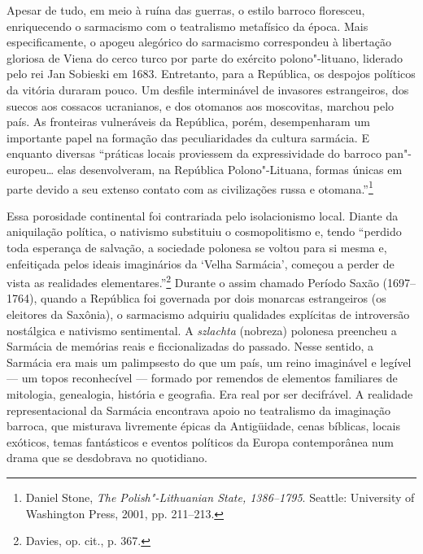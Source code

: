 Apesar de tudo, em meio à ruína das guerras, o estilo barroco floresceu,
enriquecendo o sarmacismo com o teatralismo metafísico da época. Mais
especificamente, o apogeu alegórico do sarmacismo correspondeu à
libertação gloriosa de Viena do cerco turco por parte do exército
polono"-lituano, liderado pelo rei Jan Sobieski em 1683. Entretanto, para
a República, os despojos políticos da vitória duraram pouco. Um desfile
interminável de invasores estrangeiros, dos suecos aos cossacos
ucranianos, e dos otomanos aos moscovitas, marchou pelo país. As
fronteiras vulneráveis da República, porém, desempenharam um importante
papel na formação das peculiaridades da cultura sarmácia. E enquanto
diversas ``práticas locais proviessem da expressividade do barroco
pan"-europeu\ldots{} elas desenvolveram, na República Polono"-Lituana,
formas únicas em parte devido a seu extenso contato com as civilizações
russa e otomana.''\footnote{Daniel Stone, \emph{The Polish"-Lithuanian
  State, 1386--1795}. Seattle: University of Washington Press, 2001, pp.
  211--213.}

%

Essa porosidade continental foi contrariada pelo isolacionismo local.
Diante da aniquilação política, o nativismo substituiu o cosmopolitismo
e, tendo ``perdido toda esperança de salvação, a sociedade polonesa se
voltou para si mesma e, enfeitiçada pelos ideais imaginários da `Velha
Sarmácia', começou a perder de vista as realidades
elementares.''\footnote{Davies, op. cit., p. 367.} Durante o assim
chamado Período Saxão (1697--1764), quando a República foi governada por
dois monarcas estrangeiros (os eleitores da Saxônia), o sarmacismo
adquiriu qualidades explícitas de introversão nostálgica e nativismo
sentimental. A \emph{szlachta} (nobreza) polonesa preencheu a Sarmácia
de memórias reais e ficcionalizadas do passado. Nesse sentido, a
Sarmácia era mais um palimpsesto do que um país, um reino imaginável e
legível --- um topos reconhecível --- formado por remendos de elementos
familiares de mitologia, genealogia, história e geografia. Era real por
ser decifrável. A realidade representacional da Sarmácia encontrava
apoio no teatralismo da imaginação barroca, que misturava livremente
épicas da Antigüidade, cenas bíblicas, locais exóticos, temas
fantásticos e eventos políticos da Europa contemporânea num drama que se
desdobrava no quotidiano.

